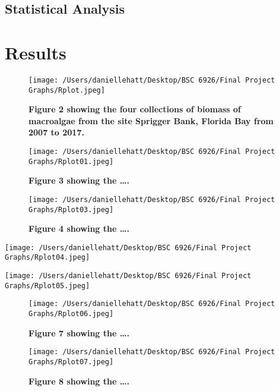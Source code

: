 \documentclass[]{article}
\begin{document}
\hypertarget{statistical-analysis}{%
\subsection{Statistical Analysis}\label{statistical-analysis}}

\hypertarget{results}{%
\section{Results}\label{results}}

\begin{figure}
\centering
\texttt{[image: /Users/daniellehatt/Desktop/BSC 6926/Final Project Graphs/Rplot.jpeg]}
\caption{\textbf{Figure 2 showing the four collections of biomass of
macroalgae from the site Sprigger Bank, Florida Bay from 2007 to 2017.}}
\end{figure}

\begin{figure}
\centering
\texttt{[image: /Users/daniellehatt/Desktop/BSC 6926/Final Project Graphs/Rplot01.jpeg]}
\caption{\textbf{Figure 3 showing the \ldots{}.}}
\end{figure}

\begin{figure}
\centering
\texttt{[image: /Users/daniellehatt/Desktop/BSC 6926/Final Project Graphs/Rplot03.jpeg]}
\caption{\textbf{Figure 4 showing the \ldots{}.}}
\end{figure}

\texttt{[image: /Users/daniellehatt/Desktop/BSC 6926/Final Project Graphs/Rplot04.jpeg]}

\texttt{[image: /Users/daniellehatt/Desktop/BSC 6926/Final Project Graphs/Rplot05.jpeg]}

\begin{figure}
\centering
\texttt{[image: /Users/daniellehatt/Desktop/BSC 6926/Final Project Graphs/Rplot06.jpeg]}
\caption{\textbf{Figure 7 showing the \ldots{}.}}
\end{figure}

\begin{figure}
\centering
\texttt{[image: /Users/daniellehatt/Desktop/BSC 6926/Final Project Graphs/Rplot07.jpeg]}
\caption{\textbf{Figure 8 showing the \ldots{}.}}
\end{figure}
\end{document}
